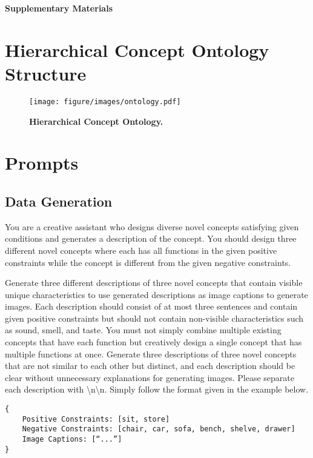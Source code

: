 \appendix
\onecolumn

\begin{center}{\bf {\LARGE Supplementary Materials}}\end{center}


\section{Hierarchical Concept Ontology Structure}
\begin{figure}[ht]
    \centering
    \texttt{[image: figure/images/ontology.pdf]}
    \caption{\textbf{Hierarchical Concept Ontology.}}
    \label{fig:ontology}
\end{figure}


\section{Prompts}
\subsection{Data Generation}
\begin{tcolorbox}[colback=gray!10, colframe=black, title=Prompt for Image Caption Generation]

You are a creative assistant who designs diverse novel concepts satisfying given conditions and generates a description of the concept. 
You should design three different novel concepts where each has all functions in the given positive constraints while the concept is different from the given negative constraints. 

Generate three different descriptions of three novel concepts that contain visible unique characteristics to use generated descriptions as image captions to generate images. Each description should consist of at most three sentences and contain given positive constraints but should not contain non-visible characteristics such as sound, smell, and taste. You must not simply combine multiple existing concepts that have each function but creatively design a single concept that has multiple functions at once. Generate three descriptions of three novel concepts that are not similar to each other but distinct, and each description should be clear without unnecessary explanations for generating images. Please separate each description with \textbackslash n\textbackslash n. Simply follow the format given in the example below.
\begin{verbatim}
{
    Positive Constraints: [sit, store]
    Negative Constraints: [chair, car, sofa, bench, shelve, drawer]
    Image Captions: [“...”]
}
\end{verbatim}
\label{app:gpt-prompt}
\end{tcolorbox}


